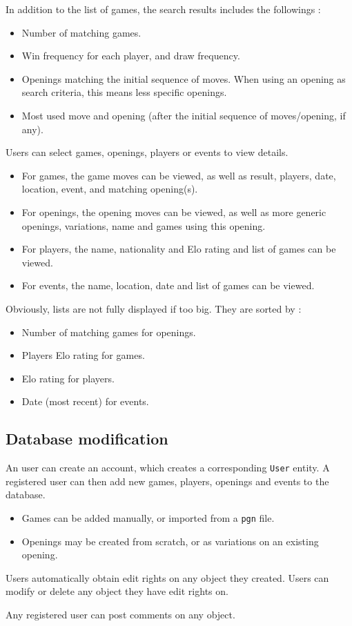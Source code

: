 \documentclass{article}
\begin{document}
In addition to the list of games, the search results includes the followings :
\begin{itemize}[noitemsep]
\item Number of matching games.
\item Win frequency for each player, and draw frequency.
\item Openings matching the initial sequence of moves.
When using an opening as search criteria, this means less specific openings.
\item Most used move and opening (after the initial sequence of moves/opening, if any).
\end{itemize}

Users can select games, openings, players or events to view details.
\begin{itemize}
\item For games, the game moves can be viewed, as well as result, players, date, location, event,
and matching opening(s).
\item For openings, the opening moves can be viewed, as well as more generic openings, variations, name
and games using this opening.
\item For players, the name, nationality and Elo rating and list of games can be viewed.
\item For events, the name, location, date and list of games can be viewed.
\end{itemize}

Obviously, lists are not fully displayed if too big.
They are sorted by :
\begin{itemize}[noitemsep]
\item Number of matching games for openings.
\item Players Elo rating for games.
\item Elo rating for players.
\item Date (most recent) for events.
\end{itemize}


\subsection{Database modification}
An user can create an account, which creates a corresponding \verb|User| entity.
A registered user can then add new games, players, openings and events to the database.
\begin{itemize}
\item Games can be added manually, or imported from a \verb|pgn| file.
\item Openings may be created from scratch, or as variations on an existing opening.
\end{itemize}

Users automatically obtain edit rights on any object they created.
Users can modify or delete any object they have edit rights on.

Any registered user can post comments on any object.
\end{document}
